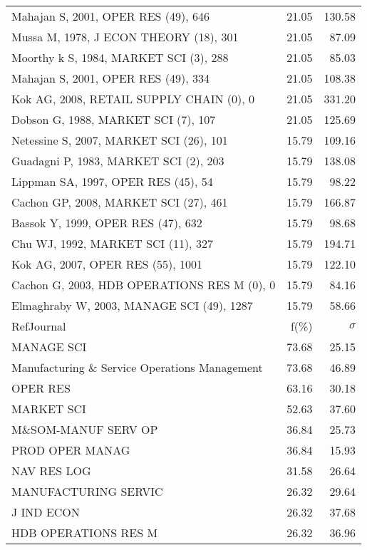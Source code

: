\documentclass[a4paper,11pt]{report}
\begin{document}
\begin{landscape}
\begin{table}[!ht]
{\begin{tabular}{|l r r|}
Mahajan S, 2001, OPER RES (49), 646 & 21.05 & 130.58\\
Mussa M, 1978, J ECON THEORY (18), 301 & 21.05 & 87.09\\
Moorthy k S, 1984, MARKET SCI (3), 288 & 21.05 & 85.03\\
Mahajan S, 2001, OPER RES (49), 334 & 21.05 & 108.38\\
Kok AG, 2008, RETAIL SUPPLY CHAIN (0), 0 & 21.05 & 331.20\\
Dobson G, 1988, MARKET SCI (7), 107 & 21.05 & 125.69\\
Netessine S, 2007, MARKET SCI (26), 101 & 15.79 & 109.16\\
Guadagni P, 1983, MARKET SCI (2), 203 & 15.79 & 138.08\\
Lippman SA, 1997, OPER RES (45), 54 & 15.79 & 98.22\\
Cachon GP, 2008, MARKET SCI (27), 461 & 15.79 & 166.87\\
Bassok Y, 1999, OPER RES (47), 632 & 15.79 & 98.68\\
Chu WJ, 1992, MARKET SCI (11), 327 & 15.79 & 194.71\\
Kok AG, 2007, OPER RES (55), 1001 & 15.79 & 122.10\\
Cachon G, 2003, HDB OPERATIONS RES M (0), 0 & 15.79 & 84.16\\
Elmaghraby W, 2003, MANAGE SCI (49), 1287 & 15.79 & 58.66\\
\hline
\hline
RefJournal & f(\%) & $\sigma$\\
\hline
MANAGE SCI & 73.68 & 25.15\\
Manufacturing \& Service Operations Management & 73.68 & 46.89\\
OPER RES & 63.16 & 30.18\\
MARKET SCI & 52.63 & 37.60\\
M\&SOM-MANUF SERV OP & 36.84 & 25.73\\
PROD OPER MANAG & 36.84 & 15.93\\
NAV RES LOG & 31.58 & 26.64\\
MANUFACTURING SERVIC & 26.32 & 29.64\\
J IND ECON & 26.32 & 37.68\\
HDB OPERATIONS RES M & 26.32 & 36.96\\
\hline
\end{tabular}
}
\end{table}

\clearpage


\end{landscape}
\end{document}
